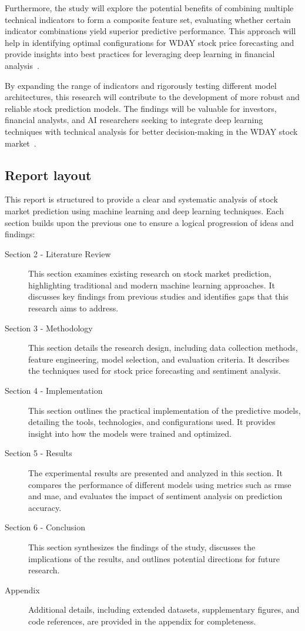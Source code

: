 Furthermore, the study will explore the potential benefits of combining multiple technical indicators to form a 
composite feature set, evaluating whether certain indicator combinations yield superior predictive performance. 
This approach will help in identifying optimal configurations for WDAY stock price forecasting and provide 
insights into best practices for leveraging deep learning in financial 
analysis~\parencite{balasubramanian2023SystematicSurvey, shaban2024SMPDL}.

By expanding the range of indicators and rigorously testing different model architectures, this research will 
contribute to the development of more robust and reliable stock prediction models. The findings will be 
valuable for investors, financial analysts, and AI researchers seeking to integrate deep learning techniques 
with technical analysis for better decision-making in the WDAY stock
market~\parencite{guo2024LSTMStock, agrawal2022StockPrediction}.

\subsection{Report layout}

This report is structured to provide a clear and systematic analysis of stock 
market prediction using machine learning and deep learning techniques. Each 
section builds upon the previous one to ensure a logical progression of ideas 
and findings:

\begin{description}
\item [Section 2 - Literature Review] This section examines existing research 
on stock market prediction, highlighting traditional and modern machine 
learning approaches. It discusses key findings from previous studies and 
identifies gaps that this research aims to address.
\item [Section 3 - Methodology] This section details the research design, 
including data collection methods, feature engineering, model selection, and 
evaluation criteria. It describes the techniques used for stock price
forecasting and sentiment analysis.
\item[Section 4 - Implementation] This section outlines the practical 
implementation of the predictive models, detailing the tools, 
technologies, and configurations used. It provides insight into how the
models were trained and optimized.
\item[Section 5 - Results] The experimental results are presented and analyzed 
in this section. It compares the performance of different models using metrics 
such as \acrshort{rmse} and \acrshort{mae}, and evaluates the impact of 
sentiment analysis on prediction accuracy.
\item[Section 6 - Conclusion] This section synthesizes the findings of the 
study, discusses the implications of the results, and outlines potential 
directions for future research.
\item[Appendix] Additional details, including extended datasets, supplementary 
figures, and code references, are provided in the appendix for completeness.
\end{description}



